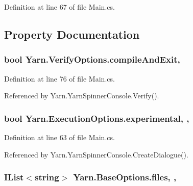 Definition at line 67 of file Main.\-cs.



\subsection{Property Documentation}
\hypertarget{a00192_af9b6917244075618720f2a90bbe6ef56}{
\subsubsection[{compile\-And\-Exit}]{\setlength{\rightskip}{0pt plus 5cm}bool Yarn.\-Verify\-Options.\-compile\-And\-Exit\hspace{0.3cm}{\ttfamily [get]}, {\ttfamily [set]}}}\label{a00192_af9b6917244075618720f2a90bbe6ef56}


Definition at line 76 of file Main.\-cs.



Referenced by Yarn.\-Yarn\-Spinner\-Console.\-Verify().

\hypertarget{a00103_ad97950e47ce2aaeb598295b7c3c44b13}{
\subsubsection[{experimental}]{\setlength{\rightskip}{0pt plus 5cm}bool Yarn.\-Execution\-Options.\-experimental\hspace{0.3cm}{\ttfamily [get]}, {\ttfamily [set]}, {\ttfamily [inherited]}}}\label{a00103_ad97950e47ce2aaeb598295b7c3c44b13}


Definition at line 63 of file Main.\-cs.



Referenced by Yarn.\-Yarn\-Spinner\-Console.\-Create\-Dialogue().

\hypertarget{a00041_aa93cbb1bc1d5328e0a417012621e92d2}{
\subsubsection[{files}]{\setlength{\rightskip}{0pt plus 5cm}I\-List$<$string$>$ Yarn.\-Base\-Options.\-files\hspace{0.3cm}{\ttfamily [get]}, {\ttfamily [set]}, {\ttfamily [inherited]}}}\label{a00041_aa93cbb1bc1d5328e0a417012621e92d2}


